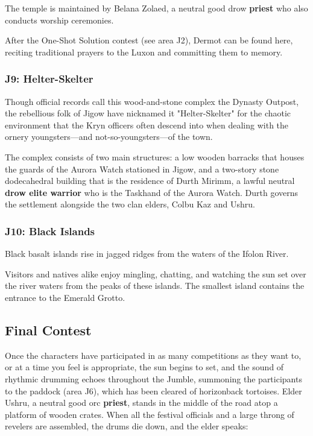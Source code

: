 \documentclass[a4paper, 11pt, bg=full, twocolumn, nooutline]{dndbook}
\begin{document}
The temple is maintained by Belana Zolaed, a neutral good drow \textbf{priest} who also conducts worship ceremonies.

After the One-Shot Solution contest (see area J2), Dermot can be found here, reciting traditional prayers to the Luxon and committing them to memory.

\subsubsection{J9: Helter-Skelter}

Though official records call this wood-and-stone complex the Dynasty Outpost, the rebellious folk of Jigow have nicknamed it "Helter-Skelter" for the chaotic environment that the Kryn officers often descend into when dealing with the ornery youngsters---and not-so-youngsters---of the town.

The complex consists of two main structures: a low wooden barracks that houses the guards of the Aurora Watch stationed in Jigow, and a two-story stone dodecahedral building that is the residence of Durth Mirimm, a lawful neutral \textbf{drow elite warrior} who is the Taskhand of the Aurora Watch. Durth governs the settlement alongside the two clan elders, Colbu Kaz and Ushru.

\subsubsection{J10: Black Islands}

\begin{DndReadAloud}
Black basalt islands rise in jagged ridges from the waters of the Ifolon River.
\end{DndReadAloud}

Visitors and natives alike enjoy mingling, chatting, and watching the sun set over the river waters from the peaks of these islands. The smallest island contains the entrance to the Emerald Grotto.

\subsection{Final Contest}

Once the characters have participated in as many competitions as they want to, or at a time you feel is appropriate, the sun begins to set, and the sound of rhythmic drumming echoes throughout the Jumble, summoning the participants to the paddock (area J6), which has been cleared of horizonback tortoises. Elder Ushru, a neutral good orc \textbf{priest}, stands in the middle of the road atop a platform of wooden crates. When all the festival officials and a large throng of revelers are assembled, the drums die down, and the elder speaks:
\end{document}
